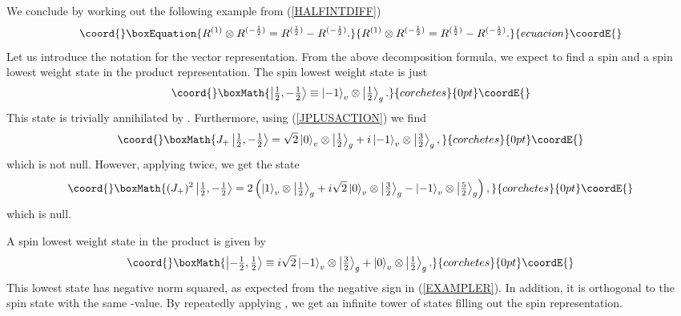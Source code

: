 \documentclass[a4paper,dvips,12pt]{article}
\providecommand {\half} {{1 \over 2}}
\providecommand {\hhalf} {{\textstyle{1 \over 2}}}
\providecommand {\ket}[1] {\left| #1 \right>}
\begin{document}
    We conclude by working out the following example from (\ref{HALFINTDIFF})
    \begin{equation}\coord{}\boxEquation{
        R^{(1)}\otimes R^{(-\half)} = R^{(\half)} - R^{(-\half)}.
        \label{EXAMPLER}
    }{
        R^{(1)}\otimes R^{(-\half)} = R^{(\half)} - R^{(-\half)}.
        }{ecuacion}\coordE{}\end{equation}
    Let us introduce the notation \myHighlight{$\ket{m}_v \equiv e^{(1)}_m$}\coordHE{} for the
    vector representation.
    From the above decomposition formula,
    we expect to find a spin \myHighlight{$\half$}\coordHE{} and a spin \myHighlight{$-\half$}\coordHE{}
    lowest weight state in the product representation.  The spin
    \myHighlight{$\half$}\coordHE{} lowest weight state is just
    \[\coord{}\boxMath{
        \ket{\hhalf, \textstyle{-\half}} \equiv \ket{-1}_v\otimes\ket{\hhalf}_g.
    }{corchetes}{0pt}\coordE{}\]
    This state is trivially annihilated by \coordHE{}.  Furthermore,
    using (\ref{JPLUSACTION}) we find
    \[\coord{}\boxMath{
        J_+\ket{\hhalf, \textstyle{-\half}} = \sqrt 2\ket{0}_v
        \otimes\ket{\hhalf}_g + i \ket{-1}_v\otimes\ket{\textstyle{{3\over 2}}}_g,
    }{corchetes}{0pt}\coordE{}\]
    which is not null.  However, applying \coordHE{} twice, we get the
    state
    \[\coord{}\boxMath{
      (J_+)^2\ket{\hhalf, \textstyle{-\half}} = 2 \left(
        \ket{1}_v\otimes\ket{\hhalf}_g + i \sqrt{2}
        \ket{0}_v\otimes\ket{\textstyle{{3\over 2}}}_g -
        \ket{-1}_v\otimes\ket{\textstyle{{5\over 2}}}_g
      \right),
    }{corchetes}{0pt}\coordE{}\]
    which is null.

    A spin \myHighlight{$-\half$}\coordHE{} lowest weight state in the product is given by
    \[\coord{}\boxMath{
        \ket{\textstyle{-\half}, \hhalf} \equiv i \sqrt 2 \ket{-1}_v
        \otimes\ket{\textstyle{{3\over 2}}}_g + \ket{0}_v\otimes
        \ket{\hhalf}_g.
    }{corchetes}{0pt}\coordE{}\]
    This lowest state has negative norm squared, as expected from
    the negative sign in (\ref{EXAMPLER}).  In addition, it is
    orthogonal to the spin \myHighlight{$\half$}\coordHE{} state \myHighlight{$J_+\ket{\half, -\half}$}\coordHE{}
    with the same \coordHE{}-value.  By repeatedly applying \coordHE{}, we get
    an infinite tower of states filling out the spin \myHighlight{$-\half$}\coordHE{}
    representation.
\end{document}
